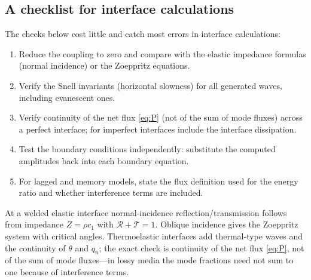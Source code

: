 \subsection{A checklist for interface calculations}
The checks below cost little and catch most errors in interface calculations:
\begin{enumerate}
\item Reduce the coupling to zero and compare with the elastic impedance formulas (normal incidence) or the Zoeppritz equations.
\item Verify the Snell invariants (horizontal slowness) for all generated waves, including evanescent ones.
\item Verify continuity of the net flux \eqref{eq:P} (not of the sum of mode fluxes) across a perfect interface; for imperfect interfaces include the interface dissipation.
\item Test the boundary conditions independently: substitute the computed amplitudes back into each boundary equation.
\item For lagged and memory models, state the flux definition used for the energy ratio and whether interference terms are included.
\end{enumerate}

\begin{summarybox}[Summary]
At a welded elastic interface normal-incidence reflection/transmission follows from impedance $Z=\rho c_1$ with $\mathcal R+\mathcal T=1$. Oblique incidence gives the Zoeppritz system with critical angles. Thermoelastic interfaces add thermal-type waves and the continuity of $\theta$ and $q_n$; the exact check is continuity of the net flux \eqref{eq:P}, not of the sum of mode fluxes---in lossy media the mode fractions need not sum to one because of interference terms.
\end{summarybox}
